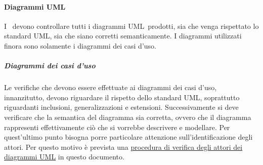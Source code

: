\documentclass[../NormeProgetto.tex]{subfiles}
\begin{document}
	\paragraph{Diagrammi UML}
		I \verificatori\ devono controllare tutti i diagrammi UML\g\ prodotti, sia che venga rispettato lo standard UML\g, sia che siano corretti semanticamente. I diagrammi utilizzati finora sono solamente i diagrammi dei casi d'uso.
			\subparagraph{Diagrammi dei casi d'uso}
			Le verifiche che devono essere effettuate ai diagrammi dei casi d'uso, innanzitutto, devono riguardare il rispetto dello standard UML\g, soprattutto riguardanti inclusioni, generalizzazioni e estensioni. Successivamente si deve verificare che la semantica del diagramma sia corretta, ovvero che il diagramma rappresenti effettivamente ciò che si vorrebbe descrivere e modellare. Per quest'ultimo punto bisogna porre particolare attenzione sull'identificazione degli attori. Per questo motivo è prevista una \hyperref[par:Procedura di verifica degli attori dei diagrammi UML]{procedura di verifica degli attori dei diagrammi UML} in questo documento.\\ 
\end{document}
